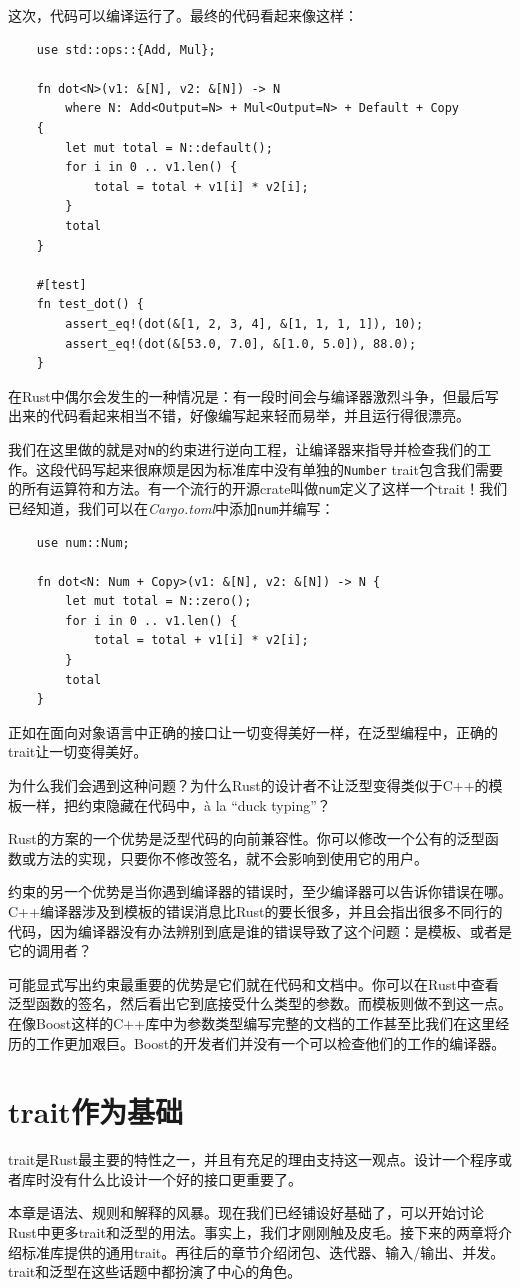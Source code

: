 这次，代码可以编译运行了。最终的代码看起来像这样：
\begin{verbatim}
    use std::ops::{Add, Mul};

    fn dot<N>(v1: &[N], v2: &[N]) -> N
        where N: Add<Output=N> + Mul<Output=N> + Default + Copy
    {
        let mut total = N::default();
        for i in 0 .. v1.len() {
            total = total + v1[i] * v2[i];
        }
        total
    }

    #[test]
    fn test_dot() {
        assert_eq!(dot(&[1, 2, 3, 4], &[1, 1, 1, 1]), 10);
        assert_eq!(dot(&[53.0, 7.0], &[1.0, 5.0]), 88.0);
    }
\end{verbatim}

在Rust中偶尔会发生的一种情况是：有一段时间会与编译器激烈斗争，但最后写出来的代码看起来相当不错，好像编写起来轻而易举，并且运行得很漂亮。 

我们在这里做的就是对\texttt{N}的约束进行逆向工程，让编译器来指导并检查我们的工作。这段代码写起来很麻烦是因为标准库中没有单独的\texttt{Number} trait包含我们需要的所有运算符和方法。有一个流行的开源crate叫做\texttt{num}定义了这样一个trait！我们已经知道，我们可以在\emph{Cargo.toml}中添加\texttt{num}并编写：
\begin{verbatim}
    use num::Num;

    fn dot<N: Num + Copy>(v1: &[N], v2: &[N]) -> N {
        let mut total = N::zero();
        for i in 0 .. v1.len() {
            total = total + v1[i] * v2[i];
        }
        total
    }
\end{verbatim}

正如在面向对象语言中正确的接口让一切变得美好一样，在泛型编程中，正确的trait让一切变得美好。

为什么我们会遇到这种问题？为什么Rust的设计者不让泛型变得类似于C++的模板一样，把约束隐藏在代码中，à la “duck typing”？

Rust的方案的一个优势是泛型代码的向前兼容性。你可以修改一个公有的泛型函数或方法的实现，只要你不修改签名，就不会影响到使用它的用户。

约束的另一个优势是当你遇到编译器的错误时，至少编译器可以告诉你错误在哪。C++编译器涉及到模板的错误消息比Rust的要长很多，并且会指出很多不同行的代码，因为编译器没有办法辨别到底是谁的错误导致了这个问题：是模板、或者是它的调用者？

可能显式写出约束最重要的优势是它们就在代码和文档中。你可以在Rust中查看泛型函数的签名，然后看出它到底接受什么类型的参数。而模板则做不到这一点。在像Boost这样的C++库中为参数类型编写完整的文档的工作甚至比我们在这里经历的工作更加艰巨。Boost的开发者们并没有一个可以检查他们的工作的编译器。

\section{trait作为基础}

trait是Rust最主要的特性之一，并且有充足的理由支持这一观点。设计一个程序或者库时没有什么比设计一个好的接口更重要了。

本章是语法、规则和解释的风暴。现在我们已经铺设好基础了，可以开始讨论Rust中更多trait和泛型的用法。事实上，我们才刚刚触及皮毛。接下来的两章将介绍标准库提供的通用trait。再往后的章节介绍闭包、迭代器、输入/输出、并发。trait和泛型在这些话题中都扮演了中心的角色。
